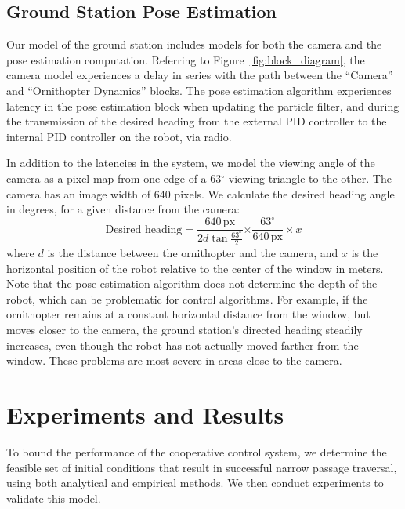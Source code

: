 \documentclass{aamas2013}
\begin{document}
\subsection{Ground Station Pose Estimation}

Our model of the ground station includes models for both the camera and the
pose estimation computation. Referring to
Figure~\ref{fig:block_diagram}, the camera model experiences a delay in series
with the path between the ``Camera'' and ``Ornithopter Dynamics'' blocks. The
pose estimation algorithm experiences latency in the pose estimation block
when updating the particle filter, and during the transmission of the desired
heading from the external PID controller to the internal PID controller on
the robot, via radio.
 
In addition to the latencies in the system, we model the viewing angle of the
camera as a pixel map from one edge of a 63$^{\circ}$ viewing triangle to the
other. The camera has an image width of 640 pixels. We calculate the desired
heading angle in degrees, for a given distance from the camera:
\begin{equation} 
\label{eq:desired_heading} 
\text{Desired heading} = \frac{640\,\text{px}}{2d\tan{\frac{63^{\circ}}{2}}}{\times\frac{63^{\circ}}{640\,\text{px}}\times x}
\end{equation}
where $d$ is the distance between the ornithopter and the camera, and $x$ is 
the horizontal position of the robot relative to the center of the window in 
meters. Note that the pose estimation algorithm 
does not determine the depth of the robot, which can be problematic for 
control algorithms. For example, if the ornithopter remains at a constant 
horizontal distance from the window, but moves closer to the 
camera, the ground station's directed heading steadily increases, even 
though the robot has not actually moved farther from the window. These 
problems are most severe in areas close to the camera.


\section{Experiments and Results}
\label{sec:performance}
To bound the performance of the cooperative control system, we determine 
the feasible set of initial conditions that result in successful narrow 
passage traversal, using both analytical and empirical methods. We then 
conduct experiments to validate this model.
\end{document}
